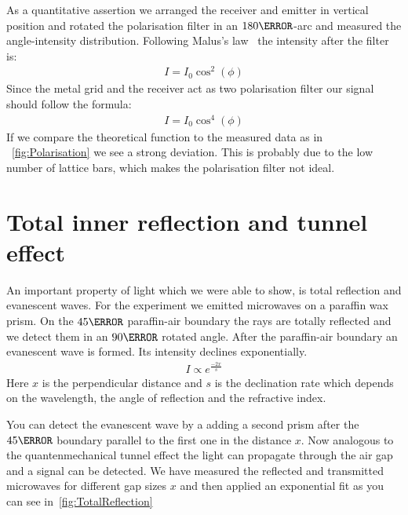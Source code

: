 \documentclass[a4paper,10pt,twocolumn]{article}
\begin{document}
    As a quantitative assertion we arranged the receiver and emitter in vertical position and rotated the polarisation
    filter in an $ 180\degree $-arc and measured the angle-intensity distribution.
    Following Malus's law~\cite{gerth} the intensity after the filter is:
    \begin{align}
        I = I_0 \cos^2(\phi)
    \end{align}
    Since the metal grid and the receiver act as two polarisation filter our signal should follow the formula:
    \begin{align}
        \label{eq:cos4}
        I = I_0 \cos^4( \phi )
    \end{align}
    If we compare the theoretical function to the measured data as in ~\ref{fig:Polarisation} we see a strong deviation.
    This is probably due to the low number of lattice bars, which makes the polarisation filter not ideal.
    
    \section{Total inner reflection and tunnel effect}
    An important property of light which we were able to show, is total reflection and evanescent waves.
    For the experiment we emitted microwaves on a paraffin wax prism. 
    On the $45\degree$ paraffin-air boundary the rays are totally reflected and we detect them in an $90\degree$ rotated
    angle. 
    After the paraffin-air boundary an evanescent wave is formed.
    Its intensity declines exponentially.
    \begin{align}
        I \propto e^{\frac{-2x}{s}} 
    \end{align}
    Here $x$ is the perpendicular distance and $s$ is the declination rate which depends on the wavelength, 
    the angle of reflection and the refractive index.

    You can detect the evanescent wave by a adding a second prism after the $ 45\degree$ boundary parallel to the first one
    in the distance $x$.
    Now analogous to the quantenmechanical tunnel effect\cite{gerth} the light can propagate through the air gap and a signal can be
    detected.
    We have measured the reflected and transmitted microwaves for different gap sizes $x$ and then applied an exponential 
    fit as you can see in~\ref{fig:TotalReflection}
\end{document}
